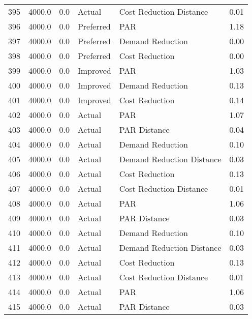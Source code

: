 \begin{longtable}{lrrllr}
395  &       4000.0 &     0.0 &         Actual &    Cost Reduction Distance &   0.01 \\
396  &       4000.0 &     0.0 &      Preferred &                        PAR &   1.18 \\
397  &       4000.0 &     0.0 &      Preferred &           Demand Reduction &   0.00 \\
398  &       4000.0 &     0.0 &      Preferred &             Cost Reduction &   0.00 \\
399  &       4000.0 &     0.0 &       Improved &                        PAR &   1.03 \\
400  &       4000.0 &     0.0 &       Improved &           Demand Reduction &   0.13 \\
401  &       4000.0 &     0.0 &       Improved &             Cost Reduction &   0.14 \\
402  &       4000.0 &     0.0 &         Actual &                        PAR &   1.07 \\
403  &       4000.0 &     0.0 &         Actual &               PAR Distance &   0.04 \\
404  &       4000.0 &     0.0 &         Actual &           Demand Reduction &   0.10 \\
405  &       4000.0 &     0.0 &         Actual &  Demand Reduction Distance &   0.03 \\
406  &       4000.0 &     0.0 &         Actual &             Cost Reduction &   0.13 \\
407  &       4000.0 &     0.0 &         Actual &    Cost Reduction Distance &   0.01 \\
408  &       4000.0 &     0.0 &         Actual &                        PAR &   1.06 \\
409  &       4000.0 &     0.0 &         Actual &               PAR Distance &   0.03 \\
410  &       4000.0 &     0.0 &         Actual &           Demand Reduction &   0.10 \\
411  &       4000.0 &     0.0 &         Actual &  Demand Reduction Distance &   0.03 \\
412  &       4000.0 &     0.0 &         Actual &             Cost Reduction &   0.13 \\
413  &       4000.0 &     0.0 &         Actual &    Cost Reduction Distance &   0.01 \\
414  &       4000.0 &     0.0 &         Actual &                        PAR &   1.06 \\
415  &       4000.0 &     0.0 &         Actual &               PAR Distance &   0.03 \\

\end{longtable}
